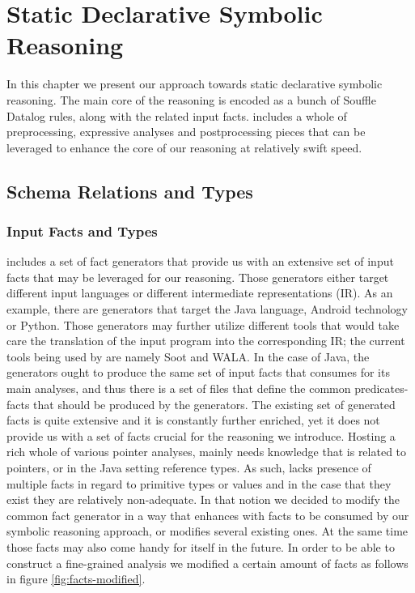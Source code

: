 \chapter{Static Declarative Symbolic Reasoning}\label{c:main-content}

In this chapter we present our approach towards static declarative
symbolic reasoning. The main core of the reasoning is encoded as a
bunch of Souffle Datalog rules, along with the related input facts.
\doop{} includes a whole of preprocessing, expressive analyses and
postprocessing pieces that can be leveraged to enhance the core of
our reasoning at relatively swift speed.

\section{Schema Relations and Types}

\subsection{Input Facts and Types}

\doop{} includes a set of fact generators that provide us with an
extensive set of input facts that may be leveraged for our reasoning.
Those generators either target different input languages or different
intermediate representations (IR). As an example, there are generators
that target the Java language, Android technology or Python. Those
generators may further utilize different tools that would take care
the translation of the input program into the corresponding IR; the
current tools being used by \doop{} are namely Soot and WALA. In the case of
Java, the generators ought to produce the same set of input facts
that \doop{} consumes for its main analyses, and thus there is a set
of files that define the common predicates-facts that should be
produced by the generators. The existing set of generated
facts is quite extensive and it is constantly further enriched, yet it
does not provide us with a set of facts crucial for the reasoning
we introduce. Hosting a rich whole of various pointer analyses,
\doop{} mainly needs knowledge that is related to pointers, or
in the Java setting reference types. As such, \doop{} lacks
presence of multiple facts in regard to primitive types or
values and in the case that they exist they are relatively
non-adequate. In that notion we decided to modify the common fact
generator in a way that enhances \doop{} with facts to be consumed
by our symbolic reasoning approach, or modifies several existing ones.
At the same time those facts may also come handy for \doop{} itself
in the future. In order to be able to construct a fine-grained
analysis we modified a certain amount of facts as follows in figure \ref{fig:facts-modified}.

